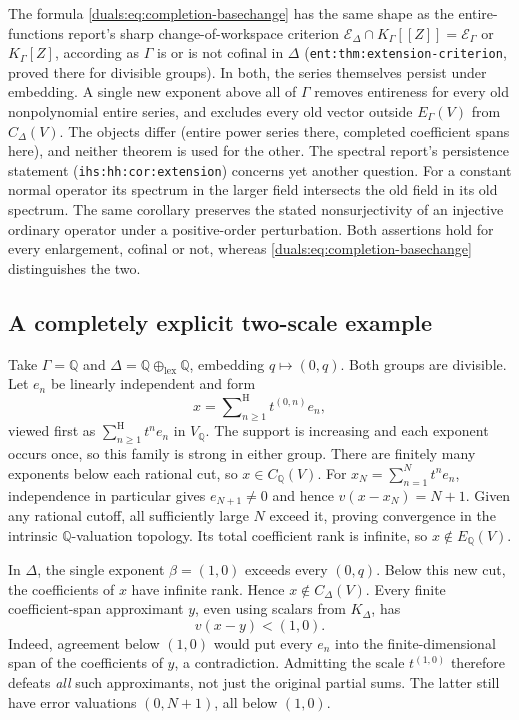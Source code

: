 \documentclass[11pt,letterpaper]{article}
\numberwithin{equation}{section}
\theoremstyle{definition}
\theoremstyle{remark}
\newcommand{\Q}{\mathbb Q}
\newcommand{\sH}{\mathop{\sum}\nolimits^{\mathrm H}}
\newcommand{\ihs}[1]{\texttt{ihs:#1}}
\newcommand{\lab}[1]{\texttt{#1}}
\begin{document}
\begin{remark}
\label{duals:rem:basechange-collection}
The formula \eqref{duals:eq:completion-basechange} has the same shape as
the entire-functions report's sharp change-of-workspace criterion
$\mathcal E_\Delta\cap K_\Gamma[[Z]]=\mathcal E_\Gamma$ or $K_\Gamma[Z]$,
according as $\Gamma$ is or is not cofinal in $\Delta$
(\lab{ent:thm:extension-criterion}, proved there for divisible groups). In
both, the series themselves persist under embedding. A single new
exponent above all of $\Gamma$ removes entireness for every old
nonpolynomial entire series, and excludes every old vector outside
$E_\Gamma(V)$ from $C_\Delta(V)$. The objects differ
(entire power series there, completed coefficient spans here), and
neither theorem is used for the other. The spectral report's persistence statement
(\ihs{hh:cor:extension}) concerns yet another question. For a constant
normal operator its spectrum in the larger field intersects the old
field in its old spectrum. The same corollary preserves the stated
nonsurjectivity of an injective ordinary operator under a positive-order
perturbation. Both assertions hold for every enlargement, cofinal or not,
whereas \eqref{duals:eq:completion-basechange} distinguishes the two.
\end{remark}

\subsection{A completely explicit two-scale example}
Take $\Gamma=\Q$ and
$\Delta=\Q\oplus_{\mathrm{lex}}\Q$, embedding $q\mapsto(0,q)$.
Both groups are divisible. Let $e_n$ be linearly independent and form
\begin{equation}\label{duals:eq:two-scale}
 x=\sH_{n\ge1}t^{(0,n)}e_n,
\end{equation}
viewed first as $\sH_{n\ge1}t^ne_n$ in $V_\Q$.
The support is increasing and each exponent occurs once, so this
family is strong in either group. There are finitely many exponents
below each rational cut, so $x\in C_\Q(V)$. For
$x_N=\sum_{n=1}^N t^ne_n$, independence in particular gives
$e_{N+1}\ne0$ and hence $v(x-x_N)=N+1$. Given any rational cutoff,
all sufficiently large $N$ exceed it, proving convergence in the
intrinsic $\Q$-valuation topology. Its total coefficient rank is infinite, so
$x\notin E_\Q(V)$.

In $\Delta$, the single exponent $\beta=(1,0)$ exceeds every
$(0,q)$. Below this new cut, the coefficients of $x$ have infinite
rank. Hence $x\notin C_\Delta(V)$. Every finite coefficient-span
approximant $y$, even using scalars from $K_\Delta$, has
\[
 v(x-y)<(1,0).
\]
Indeed, agreement below $(1,0)$ would put every $e_n$ into the
finite-dimensional span of the coefficients of $y$, a contradiction.
Admitting the scale $t^{(1,0)}$ therefore defeats \emph{all} such
approximants, not just the original partial sums. The latter still have
error valuations $(0,N+1)$, all below $(1,0)$.
\end{document}
